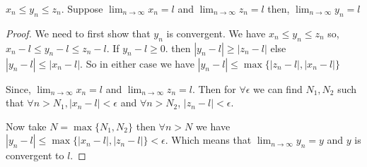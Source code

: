 \begin{eg}
    $x_n \le y_n \le z_n$. Suppose  $\lim_{n \to \infty} x_n = l$ and $\lim_{n \to \infty} z_n = l$ then, $ \lim_{n \to \infty} y_n = l $
\end{eg}
\begin{proof}
    We need to first show that $y_n$ is convergent. We have $x_n \le y_n \le z_n$  so, $x_n - l \le y_n -l \le z_n - l$. If  $y_n - l \ge 0$. then  $|y_n - l| \ge |z_n - l|$ else  $|y_n - l| \le |x_n - l|$. So in either case we have  $|y_n - l| \le \max \{|z_n - l|, |x_n - l |\} $ 
    \vspace{1em}

    Since, $\lim_{n \to \infty} x_n = l$ and $\lim_{n \to \infty} z_n = l$. Then for $\forall \epsilon$ we can find $N_1, N_2$ such that $\forall n > N_1, |x_n - l| < \epsilon$ and $\forall n > N_2$, $|z_n - l| < \epsilon$. 

    \vspace{1em}

    Now take $N = \max \{N_1, N_2\} $ then $\forall n > N$ we have $|y_n - l| \le \max \{|x_n - l|, |z_n - l|\} < \epsilon$. Which means that $\lim_{n \to \infty} y_n = y$ and $y$ is convergent to $l$.

    \vspace{1em}
\end{proof}
